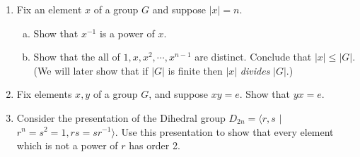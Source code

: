\documentclass[11pt]{article}
\begin{document}
\begin{enumerate}
\item Fix an element $x$ of a group $G$ and suppose $|x| = n$.  
\begin{enumerate}[(a)]
\item Show that $x^{-1}$ is a power of $x$.
\item Show that the all of $1,x,x^2,\cdots,x^{n-1}$ are distinct.  Conclude that $|x|\le|G|$.  (We will later show that if $|G|$ is finite then $|x|$ \textit{divides} $|G|$.)
\end{enumerate}
\item Fix elements $x,y$ of a group $G$, and suppose $xy=e$.  Show that $yx = e$.
\item Consider the presentation of the Dihedral group $D_{2n} = \langle r,s$ $|$ $r^n=s^2=1,rs=sr^{-1}\rangle$.  Use this presentation to show that every element which is not a power of $r$ has order 2.
\end{enumerate}
\end{document}
